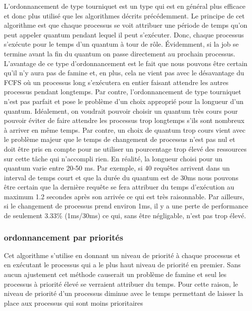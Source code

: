 \documentclass{article}
\begin{document}
L'ordonnancement de type tourniquet est un type qui est en général plus efficace et donc plus utilisé que les algorithmes décrits précédemment. Le principe de cet algorithme est que chaque processus se voit attribuer une période de temps qu'on peut appeler quantum pendant lequel il peut s'exécuter. Donc, chaque processus s'exécute pour le temps d'un quantum à tour de rôle. Évidemment, si la job se termine avant la fin du quantum on passe directement au prochain processus. L'avantage de ce type d'ordonnancement est le fait que nous pouvons être certain qu'il n'y aura pas de famine et, en plus, cela ne vient pas avec le désavantage du FCFS où un processus long s'exécutera en entier faisant attendre les autres processus pendant longtemps. Par contre, l'ordonnancement de type tourniquet n'est pas parfait et pose le problème d'un choix approprié pour la longueur d'un quantum. Idéalement, on voudrait pouvoir choisir un quantum très cours pour pouvoir éviter de faire attendre les processus trop longtemps s'ils sont nombreux à arriver en même temps. Par contre, un choix de quantum trop cours vient avec le problème majeur que le temps de changement de processus n'est pas nul et doit être pris en compte pour ne utiliser un pourcentage trop élevé des ressources sur cette tâche qui n'accompli rien.
\newline
\newline
En réalité, la longueur choisi pour un quantum varie entre 20-50 ms. Par exemple, si 40 requêtes arrivent dans un interval de temps court et que la durée du quantum est de 30ms nous pouvons être certain que la dernière requête se fera attribuer du temps d'exécution au maximum 1.2 secondes après son arrivée ce qui est très raisonnable. Par ailleurs, si le changement de processus prend environ 1ms, il y a une perte de performance de seulement 3.33\% (1ms/30ms) ce qui, sans être négligable, n'est pas trop élevé.

\subsubsection{ordonnancement par priorités}

Cet algorithme s'utilise en donnant un niveau de priorité à chaque processus et en exécutant le processus qui a le plus haut niveau de priorité en premier. Sans aucun ajustement cet méthode causerait un problème de famine et seul les processus à priorité élevé se verraient attribuer du temps. Pour cette raison, le niveau de priorité d'un processus diminue avec le temps permettant de laisser la place aux processus qui sont moins prioritaires
\newline
\newline
\end{document}
